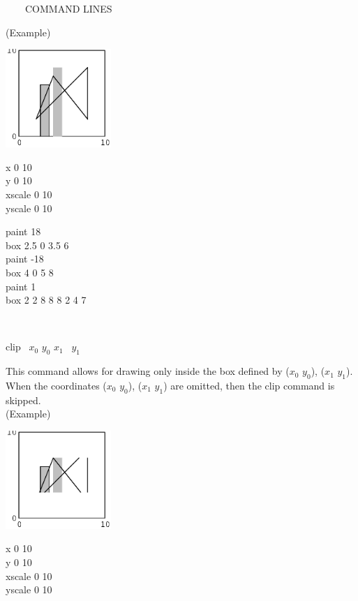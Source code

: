 \begin{qsection}{\ ~~~COMMAND LINES}
\begin{minipage}[t]{9cm}
(Example)\\
\begin{minipage}[t]{4.3cm}
 \includegraphics[width=4cm]{fig/box.eps}
\end{minipage}
\begin{minipage}[b]{4.5cm}
\baselineskip 5pt
x 0 10\\
y 0 10\\
xscale 0 10\\
yscale 0 10

\vspace*{3mm}
paint 18\\
box 2.5 0 3.5 6\\
paint -18 \\
box 4 0 5 8\\
paint 1\\
box  2 2 8 8 8 2 4 7
\end{minipage}
\end{minipage}\\

\begin{minipage}[t]{5.5cm}
clip ~$x_0$ $y_0$ $x_1$ ~$y_1$ 
\end{minipage}
\begin{minipage}[t]{9cm}
This command allows for drawing only inside the box defined by
($x_0$ $y_0$), ($x_1$ $y_1$).
When the coordinates ($x_0$ $y_0$), ($x_1$ $y_1$) are omitted,
then the clip command is skipped.\\

(Example)\\
\begin{minipage}[t]{4.3cm}
 \includegraphics[width=4cm]{fig/clip.eps}
\end{minipage}
\begin{minipage}[b]{4.5cm}
\baselineskip 5pt
x 0 10\\
y 0 10\\
xscale 0 10\\
yscale 0 10


\end{minipage}
\end{minipage}
\end{qsection}
